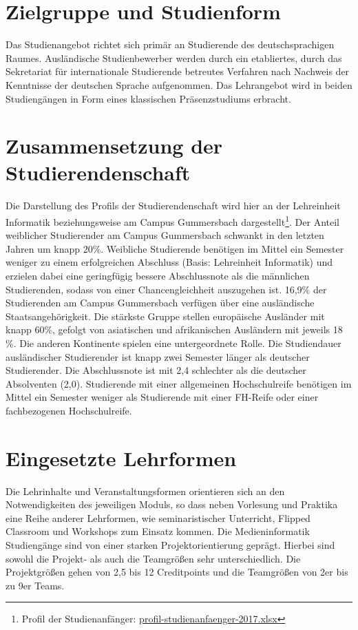 \section{Zielgruppe und
Studienform}\label{zielgruppe-und-studienform}

Das Studienangebot richtet sich primär an Studierende des
deutschsprachigen Raumes. Ausländische Studienbewerber werden durch ein
etabliertes, durch das Sekretariat für internationale Studierende
betreutes Verfahren nach Nachweis der Kenntnisse der deutschen Sprache
aufgenommen. Das Lehrangebot wird in beiden Studiengängen in Form eines
klassischen Präsenzstudiums erbracht.

\section{Zusammensetzung der
Studierendenschaft}\label{zusammensetzung-der-studierendenschaft}

Die Darstellung des Profils der Studierendenschaft wird hier an der
Lehreinheit Informatik beziehungsweise am Campus Gummersbach
dargestellt\footnote{Profil der Studienanfänger:
  \href{../anhaenge/profil-studienanfaenger-2017.xlsx}{profil-studienanfaenger-2017.xlsx}}.
Der Anteil weiblicher Studierender am Campus Gummersbach schwankt in den
letzten Jahren um knapp 20\%. Weibliche Studierende benötigen im Mittel
ein Semester weniger zu einem erfolgreichen Abschluss (Basis:
Lehreinheit Informatik) und erzielen dabei eine geringfügig bessere
Abschlussnote als die männlichen Studierenden, sodass von einer
Chancengleichheit auszugehen ist. 16,9\% der Studierenden am Campus
Gummersbach verfügen über eine ausländische Staatsangehörigkeit. Die
stärkste Gruppe stellen europäische Ausländer mit knapp 60\%, gefolgt
von asiatischen und afrikanischen Ausländern mit jeweils 18 \%. Die
anderen Kontinente spielen eine untergeordnete Rolle. Die Studiendauer
ausländischer Studierender ist knapp zwei Semester länger als deutscher
Studierender. Die Abschlussnote ist mit 2,4 schlechter als die deutscher
Absolventen (2,0). Studierende mit einer allgemeinen Hochschulreife
benötigen im Mittel ein Semester weniger als Studierende mit einer
FH-Reife oder einer fachbezogenen Hochschulreife.

\section{Eingesetzte Lehrformen}\label{eingesetzte-lehrformen}

Die Lehrinhalte und Veranstaltungsformen orientieren sich an den
Notwendigkeiten des jeweiligen Moduls, so dass neben Vorlesung und
Praktika eine Reihe anderer Lehrformen, wie seminaristischer Unterricht,
Flipped Classroom und Workshops zum Einsatz kommen. Die Medieninformatik
Studiengänge sind von einer starken Projektorientierung geprägt. Hierbei
sind sowohl die Projekt- als auch die Teamgrößen sehr unterschiedlich.
Die Projektgrößen gehen von 2,5 bis 12 Creditpoints und die Teamgrößen
von 2er bis zu 9er Teams.


